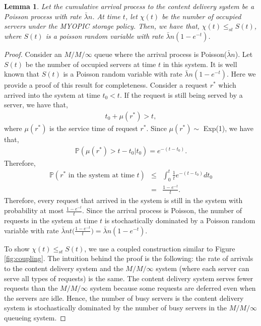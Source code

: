 \documentclass[10pt, conference, letterpaper]{IEEEtran}
\newtheorem{lemma}{Lemma}
\begin{document}
\begin{lemma}
	\label{lemma:occupancy}
	Let the cumulative arrival process to the content delivery system be a Poisson process with rate $\bar{\lambda} n$. At time $t$, let $\chi(t)$ be the number of occupied servers under the MYOPIC storage policy. Then, we have that, $\chi(t) \leq_{st} S(t)$, where $S(t)$ is a poisson random variable with rate $\bar{\lambda} n (1-e^{-t})$.
\end{lemma}
\begin{proof}
	Consider an $M/M/\infty$ queue where the arrival process is Poisson($\bar{\lambda} n$). Let $S(t)$ be the number of occupied servers at time $t$ in this system. It is well known that $S(t)$ is a Poisson random variable with rate $\bar{\lambda} n (1-e^{-t})$. Here we provide a proof of this result for completeness. Consider a request $r^*$ which arrived into the system at time $t_0 < t$. If the request is still being served by a server, we have that,
	\begin{eqnarray*}
		t_0 + \mu(r^*) > t,
	\end{eqnarray*}
	where $\mu(r^*)$ is the service time of request $r^*$. Since $\mu(r^*) \sim$ Exp(1), we have that,
	\begin{eqnarray*}
		\mathbb{P}(\mu(r^*) > t - t_0 | t_0) = e^{-(t - t_0)}.
	\end{eqnarray*}
	Therefore,
	\begin{eqnarray*}
		\mathbb{P}(r^* \text{ in the system at time $t$}) &\leq& \int_{0}^t \frac{1}{t} e^{-(t - t_0)} dt_0 \\
&=& \frac{1-e^{-t}}{t}.
	\end{eqnarray*}
	Therefore, every request that arrived in the system is still in the system with probability at most $\frac{1-e^{-t}}{t}$. Since the arrival process is Poisson, the number of requests in the system at time $t$ is stochastically dominated by a Poisson random variable with rate $\bar{\lambda} n t \big(\frac{1-e^{-t}}{t}\big) = \bar{\lambda} n (1-e^{-t})$.
	
	To show $\chi(t) \leq_{st} S(t)$, we use a coupled construction similar to Figure \ref{fig:coupling}. The intuition behind the proof is the following: the rate of arrivals to the content delivery system and the $M/M/\infty$ system (where each server can serve all types of requests) is the same. The content delivery system serves fewer requests than the $M/M/\infty$ system because some requests are deferred even when the servers are idle. Hence, the number of busy servers is the content delivery system is stochastically dominated by the number of busy servers in the $M/M/\infty$ queueing system.
\end{proof}
\end{document}
